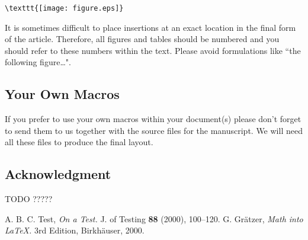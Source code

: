 \documentclass{birkjour}
\theoremstyle{definition}
\theoremstyle{remark}
\numberwithin{equation}{section}
\begin{document}
\begin{verbatim}\texttt{[image: figure.eps]}\end{verbatim}

It is sometimes difficult to place insertions at an exact location
in the final form of the article. Therefore, all figures and tables
should be numbered and you should refer to these numbers within
the text. Please avoid formulations like ``the following
figure\dots".

\subsection{Your Own Macros}

If you prefer to use your own macros within your document(s)
please don't forget to send them to us together with the source
files for the manuscript. We will need all these files to produce
the final layout.


\subsection*{Acknowledgment}
TODO ?????


\begin{thebibliography}{1}
 A. B. C. Test, \textit{On a Test.} J. of Testing
\textbf{88} (2000), 100--120.
 G. Gr\"atzer, \textit{Math into \LaTeX.} 3rd Edition,
Birkh\"auser, 2000.
\end{thebibliography}

\end{document}

